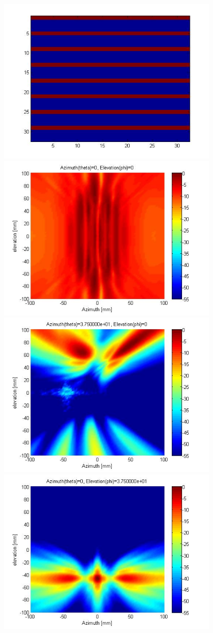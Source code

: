 \documentclass[a4paper]{article}
\begin{document}
\begin{figure}[!htbp]
%
\centering
\includegraphics[width=.7\textwidth]{1.jpg}\\
\subcaption{}\label{2}
\includegraphics[width=.7\textwidth]{2.jpg}\\
\subcaption{}\label{4}
\includegraphics[width=.7\textwidth]{3.jpg}\\
\subcaption{}\label{6}
\includegraphics[width=.7\textwidth]{4.jpg}\\

\end{figure}
\end{document}

